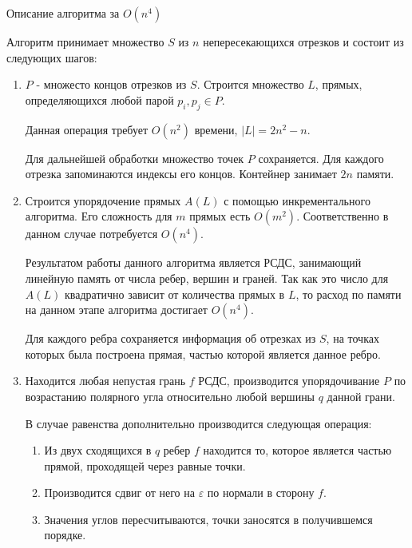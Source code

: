 \documentclass[letterpaper,12pt]{article}
\begin{document}
\begin{center}
Описание алгоритма за $O(n^4)$
\end{center}
\par
Алгоритм принимает множество $S$ из $n$ непересекающихся отрезков и 
состоит из следующих шагов:
\begin{enumerate}
      \item $P$ - множесто концов отрезков из $S$.
            Строится множество $L$, прямых, определяющихся любой парой $p_i, p_j \in P$.
            \par
            Данная операция требует $O(n^2)$ времени, $|L| = 2n^2-n$.
            \par
            Для дальнейшей обработки множество точек $P$ сохраняется.
            Для каждого отрезка запоминаются индексы его концов.
            Контейнер занимает $2n$ памяти.
      \item Строится упорядочение прямых $A(L)$ с помощью 
            инкрементального алгоритма. Его сложность для $m$ прямых
            есть $O(m^2)$. Соответственно в данном случае потребуется
            $O(n^4)$.
            \par
            Результатом работы данного алгоритма является РСДС,
            занимающий линейную память от числа ребер, вершин и граней.
            Так как это число для $A(L)$ квадратично зависит от количества
            прямых в $L$, то расход по памяти на данном этапе алгоритма достигает
            $O(n^4)$.
            \par
            Для каждого ребра сохраняется информация об отрезках из $S$,
            на точках которых была построена прямая, 
            частью которой является данное ребро.
      \item Находится любая непустая грань $f$ РСДС, производится упорядочивание $P$ 
            по возрастанию полярного угла относительно любой вершины $q$ данной грани.
            \par
            В случае равенства дополнительно производится следующая операция:
            \begin{enumerate}
                  \item Из двух сходящихся в $q$ ребер $f$ находится то, 
                        которое является частью прямой, проходящей через равные точки. 
                  \item Производится сдвиг от него на $\varepsilon$ по нормали в сторону $f$.
                  \item Значения углов пересчитываются, точки заносятся в получившемся порядке.

\end{enumerate}
\end{enumerate}
\end{document}
